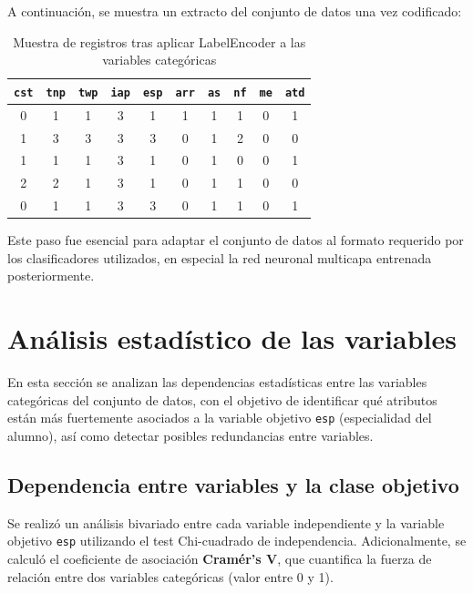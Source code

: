 \documentclass[11pt,a4paper]{article}
\begin{document}
A continuación, se muestra un extracto del conjunto de datos una vez codificado:

\begin{table}[H]
\centering
\footnotesize
\begin{tabular}{cccccccccc}
\toprule
\texttt{cst} & \texttt{tnp} & \texttt{twp} & \texttt{iap} & \texttt{esp} & \texttt{arr} & \texttt{as} & \texttt{nf} & \texttt{me} & \texttt{atd} \\
\midrule
0 & 1 & 1 & 3 & 1 & 1 & 1 & 1 & 0 & 1 \\
1 & 3 & 3 & 3 & 3 & 0 & 1 & 2 & 0 & 0 \\
1 & 1 & 1 & 3 & 1 & 0 & 1 & 0 & 0 & 1 \\
2 & 2 & 1 & 3 & 1 & 0 & 1 & 1 & 0 & 0 \\
0 & 1 & 1 & 3 & 3 & 0 & 1 & 1 & 0 & 1 \\
\bottomrule
\end{tabular}
\caption*{Muestra de registros tras aplicar LabelEncoder a las variables categóricas}
\end{table}

\medskip

Este paso fue esencial para adaptar el conjunto de datos al formato requerido por los clasificadores utilizados, en especial la red neuronal multicapa entrenada posteriormente.

\section{Análisis estadístico de las variables}

En esta sección se analizan las dependencias estadísticas entre las variables categóricas del conjunto de datos, con el objetivo de identificar qué atributos están más fuertemente asociados a la variable objetivo \texttt{esp} (especialidad del alumno), así como detectar posibles redundancias entre variables.

\subsection{Dependencia entre variables y la clase objetivo}

Se realizó un análisis bivariado entre cada variable independiente y la variable objetivo \texttt{esp} utilizando el test Chi-cuadrado de independencia. Adicionalmente, se calculó el coeficiente de asociación \textbf{Cramér’s V}, que cuantifica la fuerza de relación entre dos variables categóricas (valor entre 0 y 1).
\end{document}
